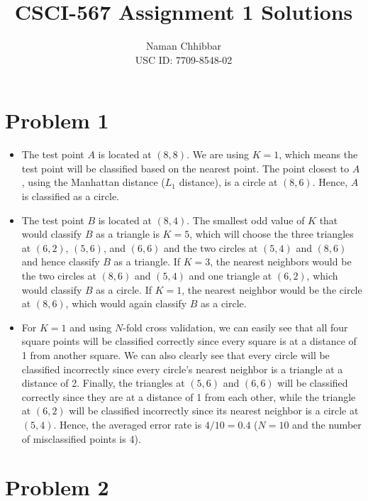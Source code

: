 \documentclass{article}
\title{CSCI-567 Assignment 1 Solutions}
\author{
  Naman Chhibbar \\
  USC ID: 7709-8548-02
}
\date{}
\begin{document}
\maketitle

\section{Problem 1}

  \begin{itemize}
    \item[1.] The test point $A$ is located at $(8, 8)$.
    We are using $K = 1$, which means the test point will be classified based on the nearest point.
    The point closest to $A$, using the Manhattan distance ($L_1$ distance), is a circle at $(8, 6)$.
    Hence, $A$ is classified as a circle.

    \item[2.] The test point $B$ is located at $(8, 4)$.
    The smallest odd value of $K$ that would classify $B$ as a triangle is $K = 5$, which will choose the three triangles at $(6, 2)$, $(5, 6)$, and $(6, 6)$ and the two circles at $(5, 4)$ and $(8, 6)$ and hence classify $B$ as a triangle.
    If $K = 3$, the nearest neighbors would be the two circles at $(8, 6)$ and $(5, 4)$ and one triangle at $(6, 2)$, which would classify $B$ as a circle.
    If $K = 1$, the nearest neighbor would be the circle at $(8, 6)$, which would again classify $B$ as a circle.

    \item[3.] For $K = 1$ and using $N$-fold cross validation, we can easily see that all four square points will be classified correctly since every square is at a distance of 1 from another square.
    We can also clearly see that every circle will be classified incorrectly since every circle's nearest neighbor is a triangle at a distance of 2.
    Finally, the triangles at $(5, 6)$ and $(6, 6)$ will be classified correctly since they are at a distance of 1 from each other, while the triangle at $(6, 2)$ will be classified incorrectly since its nearest neighbor is a circle at $(5, 4)$.
    Hence, the averaged error rate is $4 / 10 = 0.4$ ($N = 10$ and the number of misclassified points is 4).
  \end{itemize}

\section{Problem 2}
\end{document}
